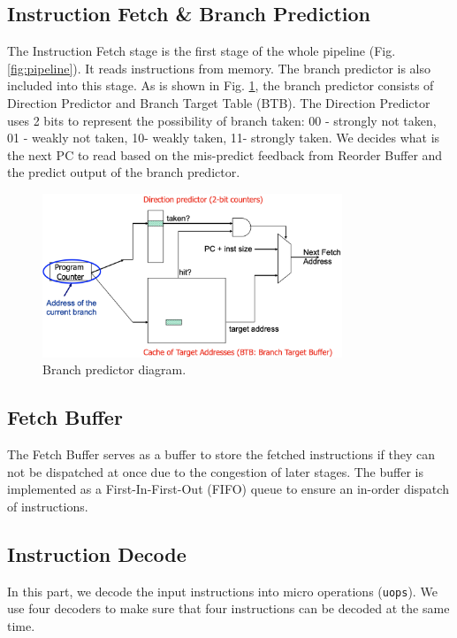 \subsection{Instruction Fetch \& Branch Prediction} %
The Instruction Fetch stage is the first stage of the whole pipeline (Fig. \ref{fig:pipeline}). It reads instructions from memory. The branch predictor is also included into this stage. As is shown in Fig. \ref{fig:br_pred}, the branch predictor consists of Direction Predictor and Branch Target Table (BTB). The Direction Predictor uses 2 bits to represent the possibility of branch taken: 00 - strongly not taken, 01 - weakly not taken, 10- weakly taken, 11- strongly taken. We decides what is the next PC to read based on the mis-predict feedback from Reorder Buffer and the predict output of the branch predictor.
\begin{figure}[!htp]
    \centering
    \includegraphics[width=0.8\textwidth]{figure/branch_predictor.png}
    \caption{Branch predictor diagram.}
    \label{fig:br_pred}
\end{figure}

\subsection{Fetch Buffer} %
The Fetch Buffer serves as a buffer to store the fetched instructions if they can not be dispatched at once due to the congestion of later stages. The buffer is implemented as a First-In-First-Out (FIFO) queue to ensure an in-order dispatch of instructions.

\subsection{Instruction Decode} %
In this part, we decode the input instructions into micro operations (\texttt{uops}). We use four decoders to make sure that four instructions can be decoded at the same time.

